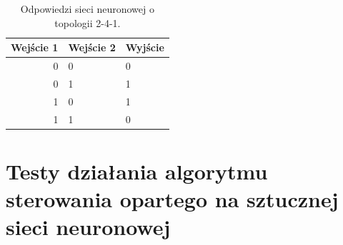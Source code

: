 \begin{table}
\centering

\label{tab:xor_output_2_4_1}
\begin{tabular}{|r|l|l|}
  \hline 
  Wejście 1 & Wejście 2 & Wyjście \\
  \hline 
  0 & 0 & 0 \\
  \hline
  0 & 1 & 1 \\
  \hline
  1 & 0 & 1 \\
  \hline
  1 & 1 & 0 \\
  \hline
\end{tabular}
\caption{Odpowiedzi sieci neuronowej o topologii 2-4-1.}
\end{table}

\section{Testy działania algorytmu sterowania opartego na sztucznej sieci neuronowej}
